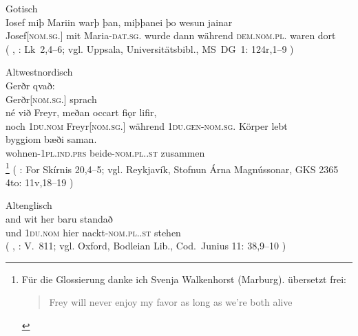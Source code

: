 \begin{exe}
\ex \label{ex:germbeide}
	\begin{xlist}
	\ex \label{ex:germbeide_1}
		\langinfo%
			{Gotisch}
			{}
			{\cite[nach][]{projectwulfila2004}}
			\\
		\gll Iosef \textelp{} miþ Mariin \textelp{} warþ þan,
				miþþanei þo wesun jainar \textelp{} \\
			Josef[\textsc{nom.sg.\MascM}] {} mit Maria-\textsc{dat.sg.\FemF} {}
				wurde dann während \textsc{dem.nom.pl.\NeutMF} waren dort {} \\
		\trans {}
			(%
				, : Lk~2,4--6;
				vgl. Uppsala, Universitätsbibl., MS~DG~1: 124r,1--9%
			)

	\ex \label{ex:germbeide_2}
		\langinfo%
			{Altwestnordisch}
			{}
			{\cite[nach][73]{neckelkuhn1962}}\\
		\gll Gerðr qvað: \textelp{} \\
			Gerðr[\textsc{nom.sg.\FemF}] sprach {} \\
		\gll né við Freyr, meðan occart fiǫr lifir, \\
			noch \textsc{1du\subMF.nom} Freyr[\textsc{nom.sg.\MascM}] während
				\textsc{1du.gen-nom.sg.\NeutMF} Körper lebt \\
		\gll byggiom bæði saman. \\
			wohnen-\textsc{1pl.ind.prs} beide-\textsc{nom.pl.\NeutMF.st} zusammen \\
		\trans {}%
			\footnote{Für die Glossierung danke ich Svenja Walkenhorst
				(Marburg). \citet[53]{terry1990} übersetzt frei:
				\foreignblockquote{english}{Frey will never
				enjoy my favor as long as we're both alive}.}
			(%
				: For Skírnis 20,4--5;
				vgl. Reykjavík, Stofnun Árna Magnússonar, GKS 2365 4to: 11v,18--19%
			)

	\ex \label{ex:germbeide_3}
		\langinfo%
			{Altenglisch}
			{}
			{\cite[nach][27]{krapp1931}}\\
		\gll and wit her baru standað \\
			und \textsc{1du\subMF.nom} hier nackt-\textsc{nom.pl.\NeutMF.st}
				stehen \\
		\trans {}
			(%
				, : V.~811;
				vgl. Oxford, Bodleian Lib., Cod.~Junius 11: 38,9--10%
			)			


\end{xlist}
\end{exe}
